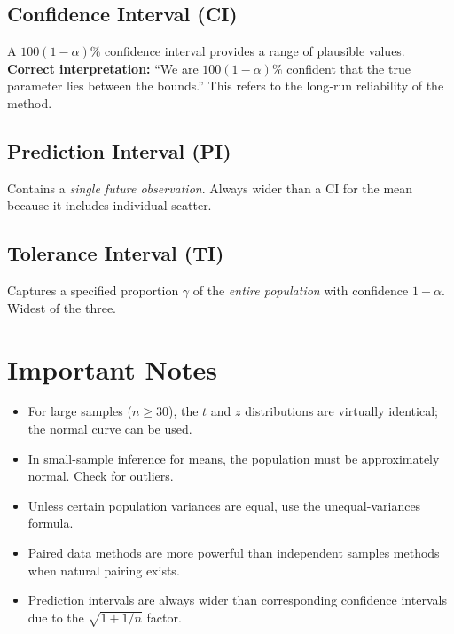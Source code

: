 \documentclass[11pt]{article}
\begin{document}
\subsection*{Confidence Interval (CI)}
A $100(1-\alpha)\%$ confidence interval provides a range of plausible values.  
\textbf{Correct interpretation:} “We are $100(1-\alpha)\%$ confident that the true parameter lies between the bounds.” This refers to the long‑run reliability of the method.

\subsection*{Prediction Interval (PI)}
Contains a \textit{single future observation}. Always wider than a CI for the mean because it includes individual scatter.

\subsection*{Tolerance Interval (TI)}
Captures a specified proportion $\gamma$ of the \textit{entire population} with confidence $1-\alpha$. Widest of the three.

\section*{Important Notes}
\begin{itemize}[nosep]
    \item For large samples ($n \geq 30$), the $t$ and $z$ distributions are virtually identical; the normal curve can be used.
    \item In small-sample inference for means, the population must be approximately normal. Check for outliers.
    \item Unless certain population variances are equal, use the unequal-variances formula.
    \item Paired data methods are more powerful than independent samples methods when natural pairing exists.
    \item Prediction intervals are always wider than corresponding confidence intervals due to the $\sqrt{1+1/n}$ factor.
\end{itemize}
\end{document}
